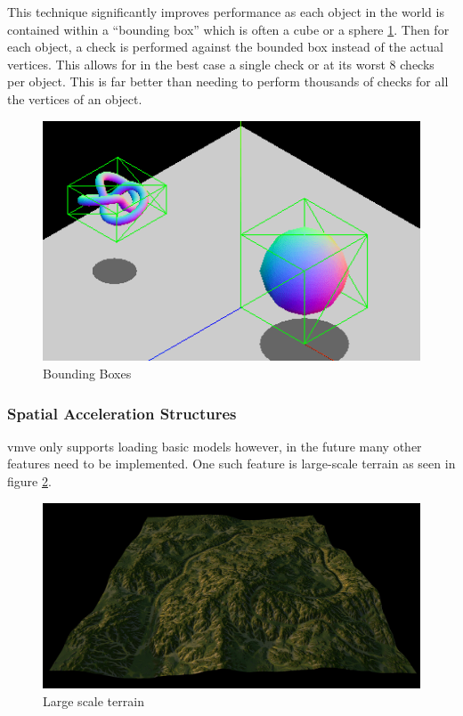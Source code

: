 \documentclass[11pt]{article}
\begin{document}
This technique significantly improves performance as each object in the world is
contained within a ``bounding box'' which is often a cube or a sphere
\ref{fig:bounding_boxes}. Then for each object, a check is performed against the
bounded box instead of the actual vertices. This allows for in the best case a
single check or at its worst 8 checks per object. This is far better than
needing to perform thousands of checks for all the vertices of an object.

\begin{figure}[H]
  \centering
  \includegraphics[width=\textwidth]{images/bounding_boxes.png}
  \caption{Bounding Boxes \cite{bounding_boxes}}
  \label{fig:bounding_boxes}
\end{figure}


\subsubsection{Spatial Acceleration Structures}
\gls*{vmve} only supports loading basic models however, in the future many other
features need to be implemented. One such feature is large-scale terrain as seen
in figure \ref{fig:quad_tree_terrain}.

\begin{figure}[H]
  \centering
  \includegraphics[width=\textwidth]{images/quad_tree_terrain.png}
  \caption{Large scale terrain}
  \label{fig:quad_tree_terrain}
\end{figure}
\end{document}
